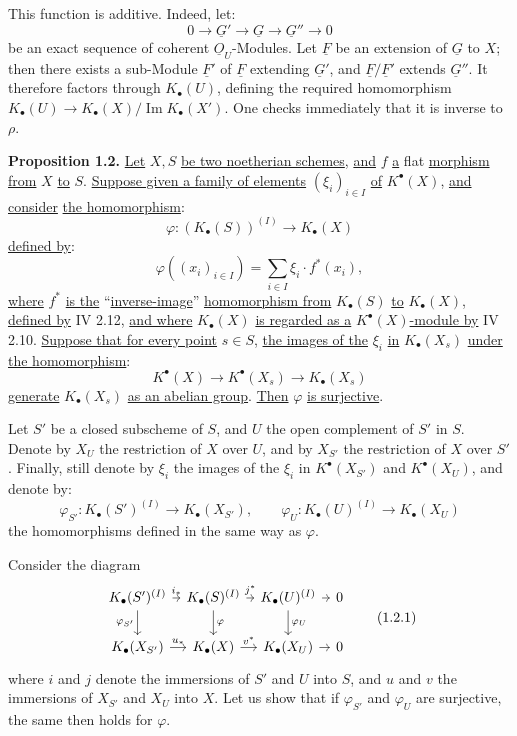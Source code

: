 This function is additive. Indeed, let:
\[
0\longrightarrow \underline{G}'\longrightarrow \underline{G}\longrightarrow \underline{G}''\longrightarrow 0
\]
be an exact sequence of coherent $\underline{O}_U$-Modules. Let $\underline{F}$ be an extension of $\underline{G}$ to $X$; then there exists a sub-Module $\underline{F}'$ of $\underline{F}$ extending $\underline{G}'$, and $\underline{F}/\underline{F}'$ extends $\underline{G}''$. It therefore factors through $K_\bullet(U)$, defining the required homomorphism $K_\bullet(U)\to K_\bullet(X)/\operatorname{Im}K_\bullet(X')$. One checks immediately that it is inverse to $\rho$.

\textbf{Proposition 1.2.} \uline{Let} $X,S$ \uline{be two noetherian schemes}, \uline{and} $f$ \uline{a} flat \uline{morphism from} $X$ \uline{to} $S$. \uline{Suppose given a family of elements} $(\xi_i)_{i\in I}$ \uline{of} $K^{\bullet}(X)$, \uline{and consider} \uline{the homomorphism}:
\[
\varphi:(K_\bullet(S))^{(I)}\longrightarrow K_\bullet(X)
\]
\uline{defined by}:
\[
\varphi((x_i)_{i\in I})=\sum_{i\in I}\xi_i\cdot f^*(x_i),
\]
\uline{where} $f^*$ \uline{is the} ``\uline{inverse-image}'' \uline{homomorphism from} $K_\bullet(S)$ \uline{to} $K_\bullet(X)$, \uline{defined by} IV 2.12, \uline{and where} $K_\bullet(X)$ \uline{is regarded as a} $K^{\bullet}(X)$\uline{-module by} IV 2.10. \uline{Suppose that for every point} $s\in S$, \uline{the images of the} $\xi_i$ \uline{in} $K_\bullet(X_s)$ \uline{under} \uline{the homomorphism}:
\[
K^{\bullet}(X)\longrightarrow K^{\bullet}(X_s)\longrightarrow K_\bullet(X_s)
\]
\uline{generate} $K_\bullet(X_s)$ \uline{as an abelian group}. \uline{Then} $\varphi$ \uline{is surjective}.

%
Let $S'$ be a closed subscheme of $S$, and $U$ the open complement of $S'$ in $S$. Denote by $X_U$ the restriction of $X$ over $U$, and by $X_{S'}$ the restriction of $X$ over $S'$. Finally, still denote by $\xi_i$ the images of the $\xi_i$ in $K^{\bullet}(X_{S'})$ and $K^{\bullet}(X_U)$, and denote by:
\[
\varphi_{S'}:K_\bullet(S')^{(I)}\to K_\bullet(X_{S'}),\qquad
\varphi_U:K_\bullet(U)^{(I)}\to K_\bullet(X_U)
\]
the homomorphisms defined in the same way as $\varphi$.

Consider the diagram
\[
\begin{tikzcd}[column sep=tiny]
K_\bullet(S')^{(I)} \arrow[r,"i_*"] \arrow[d,"\varphi_{S'}"'] & K_\bullet(S)^{(I)} \arrow[r,"j^*"] \arrow[d,"\varphi"] & K_\bullet(U)^{(I)} \arrow[r] \arrow[d,"\varphi_U"] & 0\\
K_\bullet(X_{S'}) \arrow[r,"u_*"] & K_\bullet(X) \arrow[r,"v^*"] & K_\bullet(X_U) \arrow[r] & 0
\end{tikzcd}\tag{1.2.1}
\]
where $i$ and $j$ denote the immersions of $S'$ and $U$ into $S$, and $u$ and $v$ the immersions of $X_{S'}$ and $X_U$ into $X$. Let us show that if $\varphi_{S'}$ and $\varphi_U$ are surjective, the same then holds for $\varphi$.

